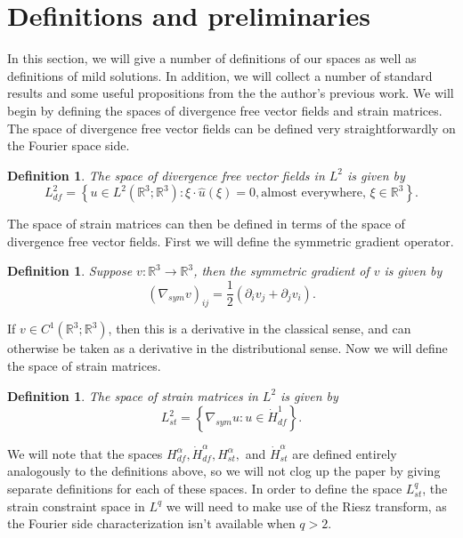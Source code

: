 \documentclass[11pt]{article}
\theoremstyle{plain}
\newtheorem{definition}[theorem]{Definition}
\theoremstyle{remark}
\numberwithin{equation}{section}
\begin{document}
\section{Definitions and preliminaries}  \label{Definitions}

In this section, we will give a number of definitions of our spaces as well as definitions of mild solutions. In addition, we will collect a number of standard results and some useful propositions from the the author's previous work.
We will begin by defining the spaces of divergence free vector fields and strain matrices.
The space of divergence free vector fields can be defined very straightforwardly on the Fourier space side.

\begin{definition}
The space of divergence free vector fields in $L^2$
is given by
\begin{equation}
    L^2_{df}=\left\{
    u\in L^2\left(\mathbb{R}^3;\mathbb{R}^3\right)
    : \xi\cdot \hat{u}(\xi)=0, \text{almost everywhere}, 
    \, 
    \xi\in\mathbb{R}^3\right\}.
\end{equation}
\end{definition}

The space of strain matrices can then be defined in terms of the space of divergence free vector fields.
First we will define the symmetric gradient operator.

\begin{definition}
Suppose $v:\mathbb{R}^3\to \mathbb{R}^3$, then the symmetric gradient of $v$ is given by
\begin{equation}
    \left(\nabla_{sym}v\right)_{ij}
    =
    \frac{1}{2}\left(\partial_i v_j+\partial_j v_i\right).
\end{equation}
\end{definition}

If $v\in C^1\left(\mathbb{R}^3;\mathbb{R}^3\right)$,
then this is a derivative in the classical sense, and can otherwise be taken as a derivative in the distributional sense.
Now we will define the space of strain matrices.

\begin{definition} \label{StrainDefL2}
The space of strain matrices in $L^2$ is given by
\begin{equation}
    L^2_{st}=\left\{\nabla_{sym}u: u\in\dot{H}^1_{df}\right\}.
\end{equation}
\end{definition}
We will note that the spaces 
$H^\alpha_{df}, \dot{H}^\alpha_{df}, 
H^\alpha_{st},$ and $\dot{H}^\alpha_{st}$
are defined entirely analogously to the definitions above,
so we will not clog up the paper by giving separate definitions for each of these spaces.
In order to define the space $L^q_{st}$, the strain constraint space in $L^q$ we will need to make use of the Riesz transform, as the Fourier side characterization isn't available when $q>2$.
\end{document}
